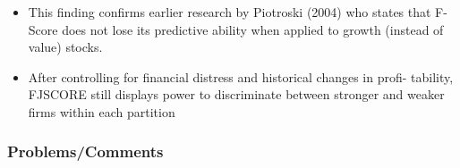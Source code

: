 \documentclass[12pt]{article}
\begin{document}
\begin{itemize}
            \item This finding confirms earlier research by Piotroski (2004) who states that F-Score does not lose its predictive ability when applied to growth (instead of value) stocks. \citep{Mohr2012}

            \item After controlling for financial distress and historical changes in profi- tability, FJSCORE still displays power to discriminate between stronger and weaker firms within each partition \citep{Piotroski2000}

        \end{itemize}

    \subsubsection{Problems/Comments}
\end{document}
